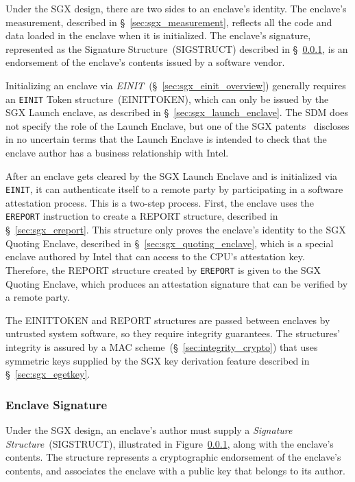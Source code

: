 Under the SGX design, there are two sides to an enclave's identity. The
enclave's measurement, described in \S~\ref{sec:sgx_measurement}, reflects all
the code and data loaded in the enclave when it is initialized. The enclave's
signature, represented as the Signature Structure~(SIGSTRUCT) described in
\S~\ref{sec:sgx_sigstruct}, is an endorsement of the enclave's contents issued
by a software vendor.

Initializing an enclave via \textit{EINIT}~(\S~\ref{sec:sgx_einit_overview})
generally requires an \texttt{EINIT} Token structure~(EINITTOKEN), which can
only be issued by the SGX Launch enclave, as described in
\S~\ref{sec:sgx_launch_enclave}. The SDM does not specify the role of the
Launch Enclave, but one of the SGX patents~\cite{intel2013patent1} discloses in
no uncertain terms that the Launch Enclave is intended to check that the
enclave author has a business relationship with Intel.

After an enclave gets cleared by the SGX Launch Enclave and is initialized via
\texttt{EINIT}, it can authenticate itself to a remote party by participating
in a software attestation process. This is a two-step process. First, the
enclave uses the \texttt{EREPORT} instruction to create a REPORT structure,
described in \S~\ref{sec:sgx_ereport}. This structure only proves the enclave's
identity to the SGX Quoting Enclave, described in
\S~\ref{sec:sgx_quoting_enclave}, which is a special enclave authored by Intel
that can access to the CPU's attestation key. Therefore, the REPORT structure
created by \texttt{EREPORT} is given to the SGX Quoting Enclave, which produces
an attestation signature that can be verified by a remote party.

The EINITTOKEN and REPORT structures are passed between enclaves by untrusted
system software, so they require integrity guarantees. The structures'
integrity is assured by a MAC scheme~(\S~\ref{sec:integrity_crypto}) that uses
symmetric keys supplied by the SGX key derivation feature described in
\S~\ref{sec:sgx_egetkey}.


\subsubsection{Enclave Signature}
\label{sec:sgx_sigstruct}
\label{sec:sgx_mrsigner}


Under the SGX design, an enclave's author must supply a
\textit{Signature Structure}~(SIGSTRUCT), illustrated in
Figure~\ref{sec:sgx_sigstruct}, along with the enclave's contents. The
structure represents a cryptographic endorsement of the enclave's contents, and
associates the enclave with a public key that belongs to its author.

